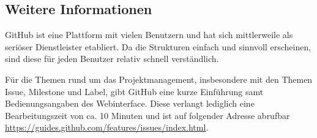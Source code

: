\subsection{Weitere Informationen}
GitHub ist eine Plattform mit vielen Benutzern und hat sich mittlerweile
als seriöser Dienstleister etabliert. Da die Strukturen einfach und sinnvoll
erscheinen, sind diese für jeden Benutzer relativ schnell verständlich.

Für die Themen rund um das Projektmanagement, insbesondere mit den Themen
\gls{Issue}, \gls{Milestone} und \gls{Label}, gibt GitHub eine kurze
Einführung samt Bedienungsangaben des Webinterface. Diese verlangt lediglich
eine Bearbeitungszeit von ca. 10 Minuten und ist auf folgender Adresse
abrufbar \url{https://guides.github.com/features/issues/index.html}.
